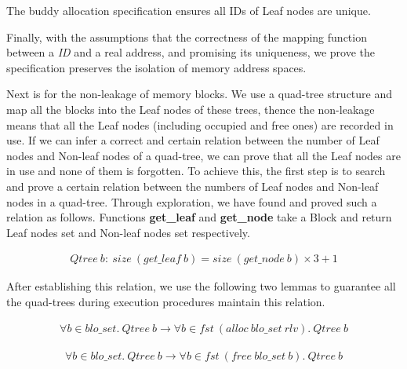 \begin{theorem}
The buddy allocation specification ensures all IDs of Leaf nodes are unique.
\end{theorem}

Finally, with the assumptions that the correctness of the mapping function between a \emph{ID} and a real address, and promising its uniqueness, we prove the specification preserves the isolation of memory address spaces.

Next is for the non-leakage of memory blocks. We use a quad-tree structure and map all the blocks into the Leaf nodes of these trees, thence the non-leakage means that all the Leaf nodes (including occupied and free ones) are recorded in use. If we can infer a correct and certain relation between the number of Leaf nodes and Non-leaf nodes of a quad-tree, we can prove that all the Leaf nodes are in use and none of them is forgotten. To achieve this, the first step is to search and prove a certain relation between the numbers of Leaf nodes and Non-leaf nodes in a quad-tree. Through exploration, we have found and proved such a relation as follows. Functions \textbf{get\_leaf} and \textbf{get\_node} take a Block and return Leaf nodes set and Non-leaf nodes set respectively.

\begin{lemma} 
\vspace{-7pt}
\end{lemma}
{\footnotesize
\begin{align*}
Qtree\ b:\ size\ (get\_leaf\ b) = size\ (get\_node\ b) \times 3 + 1
\end{align*}
}
\vspace{-12pt}

After establishing this relation, we use the following two lemmas to guarantee all the quad-trees during execution procedures maintain this relation.

\begin{lemma} 
\vspace{-7pt}
\end{lemma}
{\footnotesize
\begin{align*}
\forall b \in blo\_set.\ Qtree\ b \longrightarrow \forall b \in fst\ (alloc\ blo\_set\ rlv).\ Qtree\ b
\end{align*}
}
\vspace{-12pt}

\begin{lemma} 
\vspace{-7pt}
\end{lemma}
{\footnotesize
\begin{align*}
\forall b \in blo\_set.\ Qtree\ b \longrightarrow \forall b \in fst\ (free\ blo\_set\ b).\ Qtree\ b
\end{align*}
}
\vspace{-12pt}

